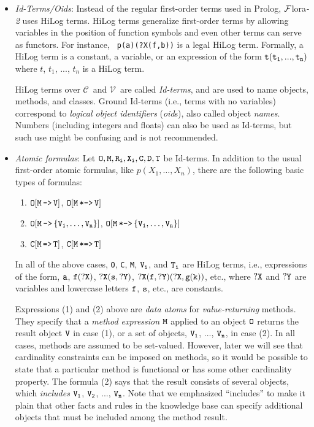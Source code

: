 \documentclass[11pt]{article}
\newcommand{\mvd}{{\mbox{\tt \,->\,}}}  %
\newcommand{\bmvd}{{\mbox{\tt \,*->\,}}}              %
\newcommand{\Mvd}{{\mbox{\tt \,=>\,}}}  %
\newcommand{\bMvd}{{\mbox{\tt \,*=>\,}}}  %
\newcommand{\FLORA}{{\mbox{\sc ${\cal F}${lora}\rm\emph{-2}}}\xspace}
\newcommand{\fl}{\mbox{F-logic}\xspace}
\newcommand{\consts}{\ensuremath{\mathcal{C}}\xspace}
\newcommand{\vars}{\ensuremath{\mathcal{V}}\xspace}
\begin{document}
\begin{itemize}
\item \emph{Id-Terms/Oids}:
  Instead of the regular first-order terms used in Prolog, \FLORA
  uses HiLog terms. HiLog terms \cite{hilog-jlp} generalize first-order
  terms by allowing variables in the position of function symbols
  and even other terms can serve as functors. For instance, {\tt
  p(a)(?X(f,b))} is a legal HiLog term. Formally, a HiLog term is a
  constant, a variable, or an expression of the form $\tt t(t_1,...,t_n)$ 
  where $t$, $t_1$, ..., $t_n$ is a HiLog term.

    HiLog terms over \consts\ and \vars\ are called \emph{Id-terms},
    and are used to name objects, methods, and classes.  Ground Id-terms
    (i.e., terms with no variables) correspond to \emph{logical
      object identifiers} (\emph{oid}s), also called object \emph{names}.
    Numbers (including integers and floats) can also be used as Id-terms,
    but such use might be confusing and is not recommended.
  \index{atomic formula!in \fl}
\item \emph{Atomic formulas}: Let $\tt O,M,R_{i},X_{i},C,D,T$ be Id-terms.  In
  addition to the usual first-order atomic formulas, like
  $p(X_1,\dots,X_n)$, there are the following basic types of formulas:
  \medskip

  \begin{enumerate}
    \item \label{eq-value-atom} $\tt O[M\mvd V]$, $\tt O[M\bmvd V]$
    \item $\tt O[M\mvd \{V_1,\dots,V_n\}]$, $\tt O[M\bmvd \{V_1,\dots,V_n\}]$
    \item $\tt C[M\Mvd T]$, $\tt C[M\bMvd T]$
  \end{enumerate}
  
  In all of the above cases, {\tt O}, {\tt C}, {\tt M}, ${\tt V_i}$, and
  ${\tt T_i}$ are HiLog terms, i.e., expressions of the form, $\tt a$,
  $\tt f(?X)$, $\tt ?X(s,?Y)$, $\tt ?X(f,?Y)(?X,g(k))$, etc., where $\tt ?X$
  and $\tt ?Y$ are variables and lowercase letters $\tt f$, $\tt s$, etc., are
  constants.
  
  Expressions (1) and (2) above are \emph{data atoms} for
  \emph{value-returning} methods. They specify that a
  \emph{method expression} $\tt M$ applied to an object $\tt O$ returns the
  result object $\tt V$ in case (1), or a set of objects, $\tt V_1$, ...,
  $\tt V_n$, in case (2). In all cases, methods are assumed to be
  set-valued. However, later we will see that cardinality
  constraints can be imposed on methods, so it would be possible to state
  that a particular method is functional or has some other cardinality
  property.
  The formula (2) says that
  the result consists of several objects, which \emph{includes} $\tt V_1$,
  $\tt V_2$, ..., $\tt V_n$. Note that we emphasized ``includes''
  to make it plain that other facts and rules in the knowledge base can specify
  additional objects that must be included among the method result.
  

\end{itemize}
\end{document}
